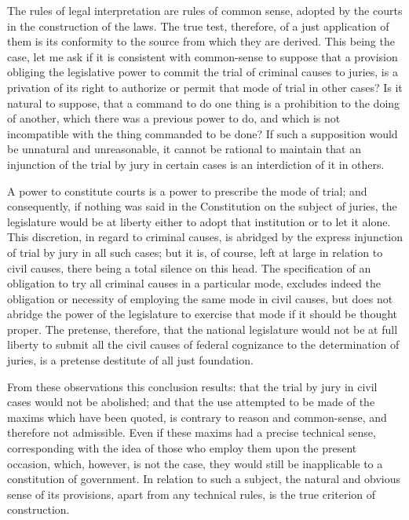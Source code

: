 The rules of legal interpretation are rules of common sense, adopted by the courts in the construction of the laws. 
The true test, therefore, of a just application of them is its conformity to the source from which they are derived. 
This being the case, let me ask if it is consistent with common-sense to suppose that a provision obliging the legislative power to commit the trial of criminal causes to juries, is a privation of its right to authorize or permit that mode of trial in other cases? 
Is it natural to suppose, that a command to do one thing is a prohibition to the doing of another, which there was a previous power to do, and which is not incompatible with the thing commanded to be done? 
If such a supposition would be unnatural and unreasonable, it cannot be rational to maintain that an injunction of the trial by jury in certain cases is an interdiction of it in others.

A power to constitute courts is a power to prescribe the mode of trial; and consequently, if nothing was said in the Constitution on the subject of juries, the legislature would be at liberty either to adopt that institution or to let it alone. 
This discretion, in regard to criminal causes, is abridged by the express injunction of trial by jury in all such cases; but it is, of course, left at large in relation to civil causes, there being a total silence on this head. 
The specification of an obligation to try all criminal causes in a particular mode, excludes indeed the obligation or necessity of employing the same mode in civil causes, but does not abridge the power of the legislature to exercise that mode if it should be thought proper. 
The pretense, therefore, that the national legislature would not be at full liberty to submit all the civil causes of federal cognizance to the determination of juries, is a pretense destitute of all just foundation.

From these observations this conclusion results: that the trial by jury in civil cases would not be abolished; and that the use attempted to be made of the maxims which have been quoted, is contrary to reason and common-sense, and therefore not admissible. 
Even if these maxims had a precise technical sense, corresponding with the idea of those who employ them upon the present occasion, which, however, is not the case, they would still be inapplicable to a constitution of government. 
In relation to such a subject, the natural and obvious sense of its provisions, apart from any technical rules, is the true criterion of construction.

